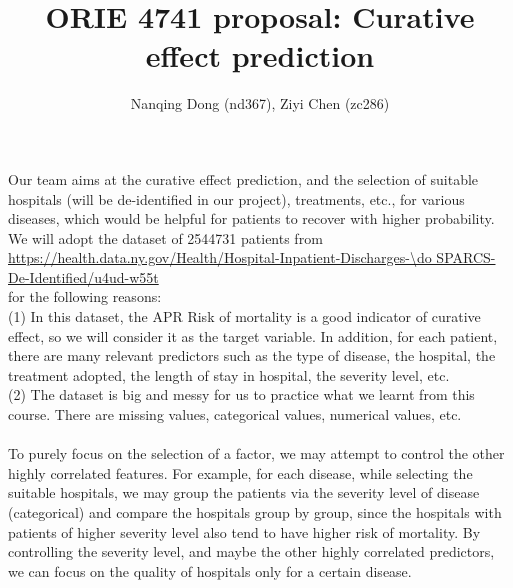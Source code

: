 \documentclass{article}
\author{Nanqing Dong (nd367), Ziyi Chen (zc286)}
\title{ORIE 4741 proposal: Curative effect prediction}
\begin{document}
\maketitle
  Our team aims at the curative effect prediction, and the selection of suitable hospitals (will be de-identified in our project), treatments, etc., for various diseases, which would be helpful for patients to recover with higher probability.
  We will adopt the dataset of 2544731 patients from\\
{\small \url{https://health.data.ny.gov/Health/Hospital-Inpatient-Discharges-\do SPARCS-De-Identified/u4ud-w55t}}\\
for the following reasons:\\
\indent
(1) In this dataset, the APR Risk of mortality is a good indicator of curative effect, so we will consider it as the target variable. In addition, for each patient, there are many relevant predictors such as the type of disease, the hospital, the treatment adopted, the length of stay in hospital, the severity level, etc.\\
\indent
(2) The dataset is big and messy for us to practice what we learnt from this course. There are missing values, categorical values, numerical values, etc.\\
\\
\indent
To purely focus on the selection of a factor, we may attempt to control the other highly correlated features. For example, for each disease, while selecting the suitable hospitals, we may group the patients via the severity level of disease (categorical) and compare the hospitals group by group, since the hospitals with patients of higher severity level also tend to have higher risk of mortality. By controlling the severity level, and maybe the other highly correlated predictors, we can focus on the quality of hospitals only for a certain disease. 
\end{document}
